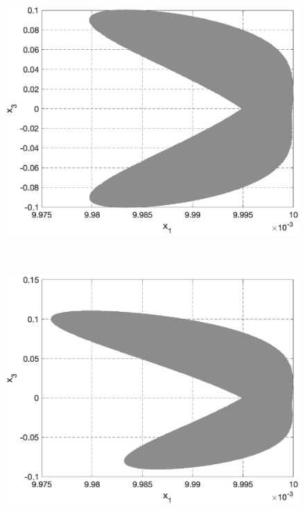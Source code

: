 \documentclass[../main.tex]{subfiles}
\begin{document}
\begin{figure}[ht!]
\begin{minipage}[b]{.49\linewidth}
			\label{fig:u=1_x1-x2}  
		\end{minipage} 
		\vfill
		\hspace{-2.5ex}
		\begin{minipage}[b]{.49\linewidth} 
			\small
			\centering 
			\includegraphics[width=\linewidth]{images/OsipovI_u=0_x1-x3.eps}
			\label{fig:u=0_x1-x3} 
		\end{minipage}
		\hfill
		\begin{minipage}[b]{.49\linewidth} 
			\small
			\centering
			\includegraphics[width=\linewidth]{images/OsipovI_u=1_x1-x3.eps}

\end{minipage}
\end{figure}
\end{document}
